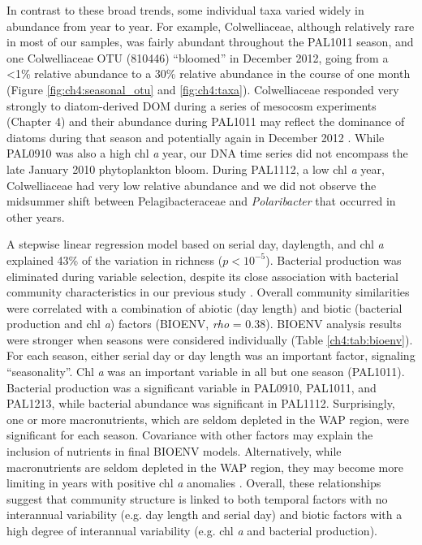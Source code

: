 In contrast to these broad trends, some individual taxa varied widely in abundance from year to year. For example, Colwelliaceae, although relatively rare in most of our samples, was fairly abundant throughout the PAL1011 season, and one Colwelliaceae OTU (810446) ``bloomed'' in December 2012, going from a {\textless}1\% relative abundance to a 30\% relative abundance in the course of one month (Figure \ref{fig:ch4:seasonal_otu} and \ref{fig:ch4:taxa}). Colwelliaceae responded very strongly to diatom-derived DOM during a series of mesocosm experiments (Chapter 4) and their abundance during PAL1011 may reflect the dominance of diatoms during that season and potentially again in December 2012 \citep{saba2014winter}. While PAL0910 was also a high chl \emph{a} year, our DNA time series did not encompass the late January 2010 phytoplankton bloom. During PAL1112, a low chl \emph{a} year, Colwelliaceae had very low relative abundance and we did not observe the midsummer shift between Pelagibacteraceae and \emph{Polaribacter} that occurred in other years.

A stepwise linear regression model based on serial day, daylength, and chl \emph{a} explained 43\% of the variation in richness ($p < 10^{-5}$). Bacterial production was eliminated during variable selection, despite its close association with bacterial community characteristics in our previous study \citep{luria2016seasonal}. Overall community similarities were correlated with a combination of abiotic (day length) and biotic (bacterial production and chl \emph{a}) factors (BIOENV, \emph{rho} = 0.38). BIOENV analysis results were stronger when seasons were considered individually (Table \ref{ch4:tab:bioenv}). For each season, either serial day or day length was an important factor, signaling ``seasonality''. Chl \emph{a} was an important variable in all but one season (PAL1011). Bacterial production was a significant variable in PAL0910, PAL1011, and PAL1213, while bacterial abundance was significant in PAL1112. Surprisingly, one or more macronutrients, which are seldom depleted in the WAP region, were significant for each season. Covariance with other factors may explain the inclusion of nutrients in final BIOENV models. Alternatively, while macronutrients are seldom depleted in the WAP region, they may become more limiting in years with positive chl \emph{a} anomalies \citep{Ducklow2007-ns,saba2014winter}. Overall, these relationships suggest that community structure is linked to both temporal factors with no interannual variability (e.g. day length and serial day) and biotic factors with a high degree of interannual variability (e.g. chl \emph{a} and bacterial production). 

